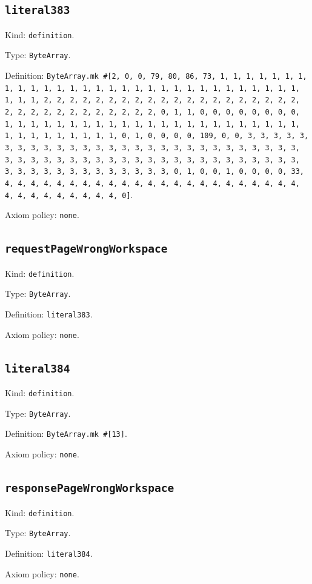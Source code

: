 \documentclass[11pt]{article}
\begin{document}
\subsection*{\texttt{literal383}}
\noindent Kind: \texttt{definition}.\par
\noindent Type: \texttt{ByteArray}.\par
\noindent Definition: \texttt{ByteArray.mk \#[2, 0, 0, 79, 80, 86, 73, 1, 1, 1, 1, 1, 1, 1, 1, 1, 1, 1, 1, 1, 1, 1, 1, 1, 1, 1, 1, 1, 1, 1, 1, 1, 1, 1, 1, 1, 1, 1, 1, 1, 2, 2, 2, 2, 2, 2, 2, 2, 2, 2, 2, 2, 2, 2, 2, 2, 2, 2, 2, 2, 2, 2, 2, 2, 2, 2, 2, 2, 2, 2, 2, 2, 0, 1, 1, 0, 0, 0, 0, 0, 0, 0, 0, 1, 1, 1, 1, 1, 1, 1, 1, 1, 1, 1, 1, 1, 1, 1, 1, 1, 1, 1, 1, 1, 1, 1, 1, 1, 1, 1, 1, 1, 1, 1, 1, 0, 1, 0, 0, 0, 0, 109, 0, 0, 3, 3, 3, 3, 3, 3, 3, 3, 3, 3, 3, 3, 3, 3, 3, 3, 3, 3, 3, 3, 3, 3, 3, 3, 3, 3, 3, 3, 3, 3, 3, 3, 3, 3, 3, 3, 3, 3, 3, 3, 3, 3, 3, 3, 3, 3, 3, 3, 3, 3, 3, 3, 3, 3, 3, 3, 3, 3, 3, 3, 3, 3, 3, 3, 0, 1, 0, 0, 1, 0, 0, 0, 0, 33, 4, 4, 4, 4, 4, 4, 4, 4, 4, 4, 4, 4, 4, 4, 4, 4, 4, 4, 4, 4, 4, 4, 4, 4, 4, 4, 4, 4, 4, 4, 4, 4, 0]}.\par
\noindent Axiom policy: \texttt{none}.\par
\subsection*{\texttt{requestPageWrongWorkspace}}
\noindent Kind: \texttt{definition}.\par
\noindent Type: \texttt{ByteArray}.\par
\noindent Definition: \texttt{literal383}.\par
\noindent Axiom policy: \texttt{none}.\par
\subsection*{\texttt{literal384}}
\noindent Kind: \texttt{definition}.\par
\noindent Type: \texttt{ByteArray}.\par
\noindent Definition: \texttt{ByteArray.mk \#[13]}.\par
\noindent Axiom policy: \texttt{none}.\par
\subsection*{\texttt{responsePageWrongWorkspace}}
\noindent Kind: \texttt{definition}.\par
\noindent Type: \texttt{ByteArray}.\par
\noindent Definition: \texttt{literal384}.\par
\noindent Axiom policy: \texttt{none}.\par
\end{document}
